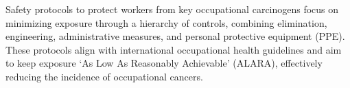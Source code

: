 Safety protocols to protect workers from key occupational carcinogens focus on minimizing exposure 
through a hierarchy of controls, combining elimination, engineering, administrative measures, and 
personal protective equipment (PPE). These protocols align with international occupational health 
guidelines and aim to keep exposure `As Low As Reasonably Achievable' (ALARA), effectively reducing 
the incidence of occupational cancers.
